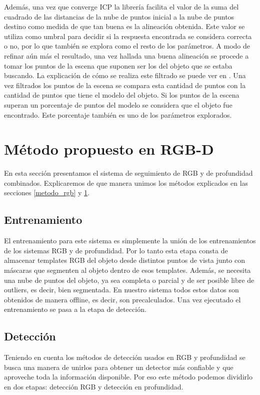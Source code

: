 Además, una vez que converge ICP la librería facilita el valor de la suma del cuadrado de las distancias de la nube de puntos inicial a la nube de puntos destino como medida de que tan buena es la alineación obtenida. Este valor se utiliza como umbral para decidir si la respuesta encontrada se considera correcta o no, por lo que también se explora como el resto de los parámetros. A modo de refinar aún más el resultado, una vez hallada una buena alineación se procede a tomar los puntos de la escena que suponen ser los del objeto que se estaba buscando. La explicación de cómo se realiza este filtrado se puede ver en . Una vez filtrados los puntos de la escena se compara esta cantidad de puntos con la cantidad de puntos que tiene el modelo del objeto. Si los puntos de la escena superan un porcentaje de puntos del modelo se considera que el objeto fue encontrado. Este porcentaje también es uno de los parámetros explorados.


\section{Método propuesto en RGB-D}\label{metodo_rgbd}
En esta sección presentamos el sistema de seguimiento de RGB y de profundidad combinados. Explicaremos de que manera unimos los métodos explicados en las secciones \ref{metodo_rgb} y \ref{metodo_rgbd}.

\subsection{Entrenamiento}
El entrenamiento para este sistema es simplemente la unión de los entrenamientos de los sistemas RGB y de profundidad. Por lo tanto esta etapa consta de almacenar templates RGB del objeto desde distintos puntos de vista junto con máscaras que segmenten al objeto dentro de esos templates. Además, se necesita una nube de puntos del objeto, ya sea completa o parcial y de ser posible libre de outliers, es decir, bien segmentada. En nuestro sistema todos estos datos son obtenidos de manera offline, es decir, son precalculados. Una vez ejecutado el entrenamiento se pasa a la etapa de detección.

\subsection{Detección}
Teniendo en cuenta los métodos de detección usados en RGB y profundidad se busca una manera de unirlos para obtener un detector más confiable y que aproveche toda la información disponible. Por eso este método podemos dividirlo en dos etapas: detección RGB y detección en profundidad.

